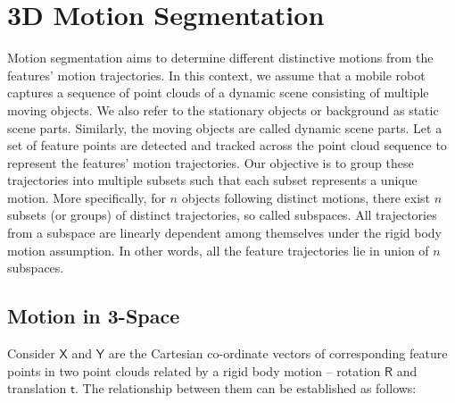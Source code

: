 \documentclass[10pt,twocolumn,letterpaper]{article}  %
\begin{document}
\section{3D Motion Segmentation}
\label{sec:3D-SSC}
Motion segmentation aims to determine different distinctive motions from the features' motion trajectories. In this context, we assume that a mobile robot captures a sequence of point clouds of a dynamic scene consisting of multiple moving objects. We also refer to the stationary objects or background as static scene parts. Similarly, the moving objects are called dynamic scene parts. Let a set of feature points are detected and tracked across the point cloud sequence to represent the features' motion trajectories. Our objective is to group these trajectories into multiple subsets such that each subset represents  a unique motion. More specifically, for $n$ objects following distinct motions, there exist $n$ subsets (or groups) of distinct trajectories, so called subspaces. All trajectories from a subspace are linearly dependent among themselves under the rigid body motion assumption. In other words, all the feature trajectories lie in union of $n$ subspaces.  



\subsection{Motion in 3-Space}
\label{ibms}
Consider $\mathsf{X}$ and $\mathsf{Y}$ are the Cartesian co-ordinate vectors of corresponding feature points in two point clouds related by a rigid body motion -- rotation $\mathsf{R}$ and translation $\mathsf{t}$. The relationship between them can be established as follows:
\end{document}
